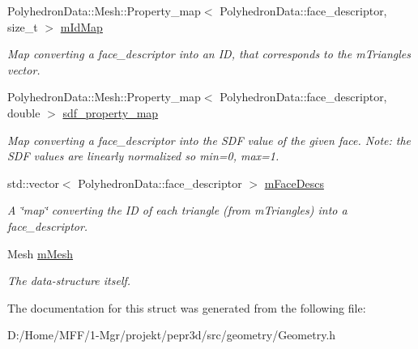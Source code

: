 \begin{DoxyCompactItemize}
Polyhedron\+Data\+::\+Mesh\+::\+Property\+\_\+map$<$ Polyhedron\+Data\+::face\+\_\+descriptor, size\+\_\+t $>$ \mbox{\hyperlink{structpepr3d_1_1_geometry_1_1_polyhedron_data_af684234a6d2f2525012d436991b2c737}{m\+Id\+Map}}
\begin{DoxyCompactList}\small\item\em Map converting a face\+\_\+descriptor into an ID, that corresponds to the m\+Triangles vector. \end{DoxyCompactList}\item 
\mbox{\label{structpepr3d_1_1_geometry_1_1_polyhedron_data_ad52df8d125ee13a46b4eb3ee8ea4b3d0}} 
Polyhedron\+Data\+::\+Mesh\+::\+Property\+\_\+map$<$ Polyhedron\+Data\+::face\+\_\+descriptor, double $>$ \mbox{\hyperlink{structpepr3d_1_1_geometry_1_1_polyhedron_data_ad52df8d125ee13a46b4eb3ee8ea4b3d0}{sdf\+\_\+property\+\_\+map}}
\begin{DoxyCompactList}\small\item\em Map converting a face\+\_\+descriptor into the S\+DF value of the given face. Note\+: the S\+DF values are linearly normalized so min=0, max=1. \end{DoxyCompactList}\item 
\mbox{\label{structpepr3d_1_1_geometry_1_1_polyhedron_data_aec825a36439f1a496bf2c2c33fd49dfd}} 
std\+::vector$<$ Polyhedron\+Data\+::face\+\_\+descriptor $>$ \mbox{\hyperlink{structpepr3d_1_1_geometry_1_1_polyhedron_data_aec825a36439f1a496bf2c2c33fd49dfd}{m\+Face\+Descs}}
\begin{DoxyCompactList}\small\item\em A \char`\"{}map\char`\"{} converting the ID of each triangle (from m\+Triangles) into a face\+\_\+descriptor. \end{DoxyCompactList}\item 
\mbox{\label{structpepr3d_1_1_geometry_1_1_polyhedron_data_ad9a9922e7583365b50f5e5cb1c546539}} 
Mesh \mbox{\hyperlink{structpepr3d_1_1_geometry_1_1_polyhedron_data_ad9a9922e7583365b50f5e5cb1c546539}{m\+Mesh}}
\begin{DoxyCompactList}\small\item\em The data-\/structure itself. \end{DoxyCompactList}\end{DoxyCompactItemize}


The documentation for this struct was generated from the following file\+:\begin{DoxyCompactItemize}
\item 
D\+:/\+Home/\+M\+F\+F/1-\/\+Mgr/projekt/pepr3d/src/geometry/Geometry.\+h\end{DoxyCompactItemize}
